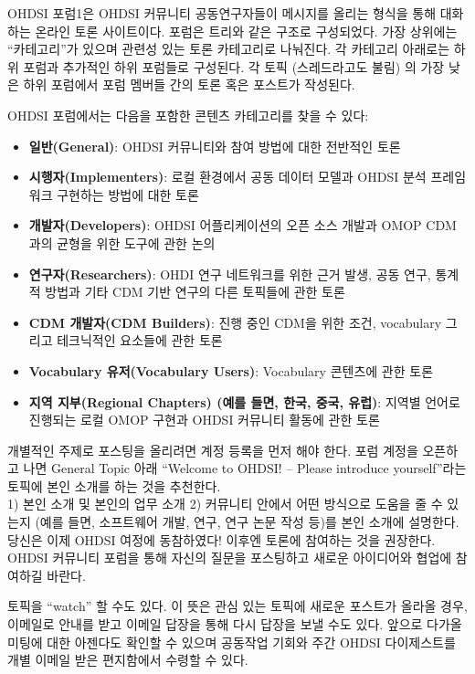 \documentclass[11pt]{book}
\providecommand{\tightlist}{%
  \setlength{\itemsep}{0pt}\setlength{\parskip}{0pt}}
\theoremstyle{definition}
\theoremstyle{definition}
\theoremstyle{definition}
\theoremstyle{remark}
\let\BeginKnitrBlock\begin \let\EndKnitrBlock\end
\begin{document}
OHDSI 포럼1은 OHDSI 커뮤니티 공동연구자들이 메시지를 올리는 형식을 통해
대화하는 온라인 토론 사이트이다. 포럼은 트리와 같은 구조로 구성되었다.
가장 상위에는 ``카테고리''가 있으며 관련성 있는 토론 카테고리로
나눠진다. 각 카테고리 아래로는 하위 포럼과 추가적인 하위 포럼들로
구성된다. 각 토픽 (스레드라고도 불림) 의 가장 낮은 하위 포럼에서 포럼
멤버들 간의 토론 혹은 포스트가 작성된다.

OHDSI 포럼에서는 다음을 포함한 콘텐츠 카테고리를 찾을 수 있다:

\begin{itemize}
\tightlist
\item
  \textbf{일반(General)}: OHDSI 커뮤니티와 참여 방법에 대한 전반적인
  토론
\item
  \textbf{시행자(Implementers)}: 로컬 환경에서 공동 데이터 모델과 OHDSI
  분석 프레임워크 구현하는 방법에 대한 토론
\item
  \textbf{개발자(Developers)}: OHDSI 어플리케이션의 오픈 소스 개발과
  OMOP CDM과의 균형을 위한 도구에 관한 논의
\item
  \textbf{연구자(Researchers)}: OHDI 연구 네트워크를 위한 근거 발생,
  공동 연구, 통계적 방법과 기타 CDM 기반 연구의 다른 토픽들에 관한 토론
\item
  \textbf{CDM 개발자(CDM Builders)}: 진행 중인 CDM을 위한 조건,
  vocabulary 그리고 테크닉적인 요소들에 관한 토론
\item
  \textbf{Vocabulary 유저(Vocabulary Users)}: Vocabulary 콘텐츠에 관한
  토론
\item
  \textbf{지역 지부(Regional Chapters) (예를 들면, 한국, 중국, 유럽)}:
  지역별 언어로 진행되는 로컬 OMOP 구현과 OHDSI 커뮤니티 활동에 관한
  토론
\end{itemize}

개별적인 주제로 포스팅을 올리려면 계정 등록을 먼저 해야 한다. 포럼
계정을 오픈하고 나면 General Topic 아래 ``Welcome to OHDSI! -- Please
introduce yourself''라는 토픽에 본인 소개를 하는 것을 추천한다.\\
1) 본인 소개 및 본인의 업무 소개 2) 커뮤니티 안에서 어떤 방식으로 도움을
줄 수 있는지 (예를 들면, 소프트웨어 개발, 연구, 연구 논문 작성 등)를
본인 소개에 설명한다. 당신은 이제 OHDSI 여정에 동참하였다! 이후엔 토론에
참여하는 것을 권장한다. OHDSI 커뮤니티 포럼을 통해 자신의 질문을
포스팅하고 새로운 아이디어와 협업에 참여하길 바란다. 

\BeginKnitrBlock{rmdimportant}
토픽을 ``watch'' 할 수도 있다. 이 뜻은 관심 있는 토픽에 새로운 포스트가
올라올 경우, 이메일로 안내를 받고 이메일 답장을 통해 다시 답장을 보낼
수도 있다. 앞으로 다가올 미팅에 대한 아젠다도 확인할 수 있으며 공동작업
기회와 주간 OHDSI 다이제스트를 개별 이메일 받은 편지함에서 수령할 수
있다.
\EndKnitrBlock{rmdimportant}
\end{document}
